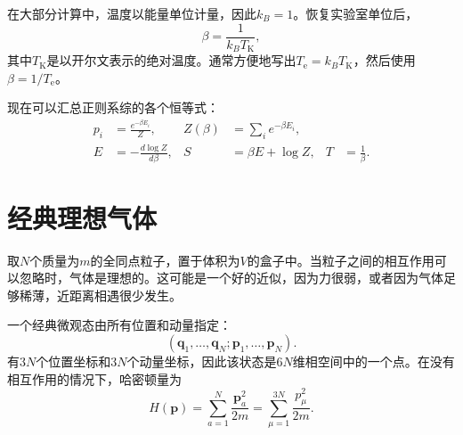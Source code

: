 在大部分计算中，温度以能量单位计量，因此\(k_B=1\)。恢复实验室单位后，
\begin{equation}
 \beta=\frac{1}{k_B T_{\mathrm K}},
 \label{eq:sm4-beta-laboratory}
\end{equation}
其中\(T_{\mathrm K}\)是以开尔文表示的绝对温度。通常方便地写出\(T_{\mathrm e}=k_BT_{\mathrm K}\)，然后使用\(\beta=1/T_{\mathrm e}\)。

\begin{classroomqa}
\end{classroomqa}

现在可以汇总正则系综的各个恒等式：
\begin{align}
 p_i&=\frac{e^{-\beta E_i}}{Z},&
 Z(\beta)&=\sum_i e^{-\beta E_i},\label{eq:sm4-canonical-pair}\\
 E&=-\frac{d\log Z}{d\beta},&
 S&=\beta E+\log Z,&
 T&=\frac{1}{\beta}.
 \label{eq:sm4-canonical-identities}
\end{align}

\section{经典理想气体}

取\(N\)个质量为\(m\)的全同点粒子，置于体积为\(V\)的盒子中。当粒子之间的相互作用可以忽略时，气体是理想的。这可能是一个好的近似，因为力很弱，或者因为气体足够稀薄，近距离相遇很少发生。

一个经典微观态由所有位置和动量指定：
\begin{equation}
 (\bm q_1,\ldots,\bm q_N;\bm p_1,\ldots,\bm p_N).
\end{equation}
有\(3N\)个位置坐标和\(3N\)个动量坐标，因此该状态是\(6N\)维相空间中的一个点。在没有相互作用的情况下，哈密顿量为
\begin{equation}
 H(\bm p)=\sum_{a=1}^{N}\frac{\bm p_a^2}{2m}
 =\sum_{\mu=1}^{3N}\frac{p_\mu^2}{2m}.
 \label{eq:sm4-ideal-hamiltonian}
\end{equation}

\begin{classroomqa}
\end{classroomqa}

